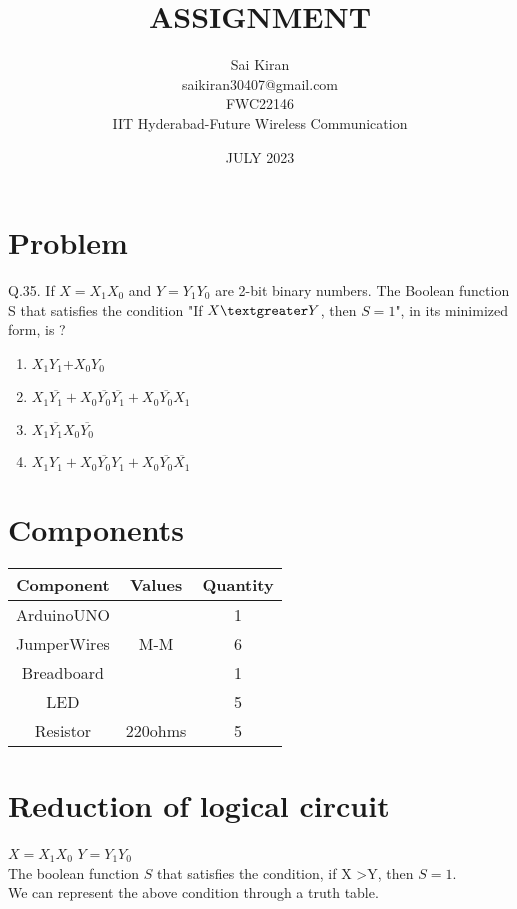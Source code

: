 \documentclass{article}
\title{ASSIGNMENT}
\date{JULY 2023}
\author{Sai Kiran \\saikiran30407@gmail.com\\FWC22146\\IIT Hyderabad-Future Wireless Communication }
\date{}
\begin{document}
\maketitle
 \tableofcontents

\pagebreak
\section{Problem}
 Q.35.  If $X = X_1X_0$ and $Y = Y_1Y_0$ are 2-bit binary numbers. The Boolean function S that satisfies the condition "If $X \textgreater Y$, then $S= 1$", in its minimized form, is ?\\
 \begin{enumerate}
 
     \item$X_1Y_1$+$X_0Y_0$
     \item$X_1\overline{Y_1}+X_0\overline{Y_0}\overline{Y_1}+X_0\overline{Y_0}X_1$
     \item$X_1\overline{Y_1}X_0\overline{Y_0}$
     \item$X_1Y_1+X_0\overline{Y_0}Y_1+X_0\overline{Y_0}\overline{X_1}$
 \end{enumerate}
 
 \section{Components}
  \begin{table}[h]
  \centering
   \begin{tabular}{|c|c|c|}
   \hline
   \textbf{Component}& \textbf{Values} & \textbf{Quantity}\\
\hline
ArduinoUNO &  & 1 \\  
\hline
JumperWires& M-M & 6 \\ 
\hline
Breadboard &  & 1 \\
\hline
LED & &5 \\
\hline
Resistor &220ohms & 5\\
\hline
   \end{tabular}
   \end{table}


\section{Reduction of logical circuit}


    $X=X_1X_0$ $Y=Y_1Y_0$\\
    The boolean function $S$ that satisfies the condition,
    if X \textgreater Y, then  $S=1$.\\
    We can represent the above condition through a truth table.
\end{document}
